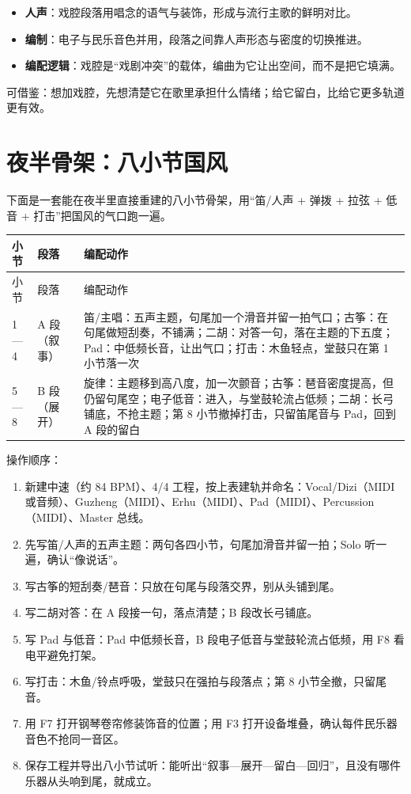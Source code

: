\begin{itemize}
\item \textbf{人声}：戏腔段落用唱念的语气与装饰，形成与流行主歌的鲜明对比。
\item \textbf{编制}：电子与民乐音色并用，段落之间靠人声形态与密度的切换推进。
\item \textbf{编配逻辑}：戏腔是“戏剧冲突”的载体，编曲为它让出空间，而不是把它填满。
\end{itemize}

可借鉴：想加戏腔，先想清楚它在歌里承担什么情绪；给它留白，比给它更多轨道更有效。

\section{夜半骨架：八小节国风}
\label{sec:guofeng-yeban}

下面是一套能在夜半里直接重建的八小节骨架，用“笛/人声 + 弹拨 + 拉弦 + 低音 + 打击”把国风的气口跑一遍。

\begin{longtable}{p{}p{}p{}}
\toprule
小节 & 段落 & 编配动作 \\
\midrule
\endfirsthead
\toprule
小节 & 段落 & 编配动作 \\
\midrule
\endhead
1—4 & A 段（叙事） & 笛/主唱：五声主题，句尾加一个滑音并留一拍气口；古筝：在句尾做短刮奏，不铺满；二胡：对答一句，落在主题的下五度；Pad：中低频长音，让出气口；打击：木鱼轻点，堂鼓只在第 1 小节落一次 \\
5—8 & B 段（展开） & 旋律：主题移到高八度，加一次颤音；古筝：琶音密度提高，但仍留句尾空；电子低音：进入，与堂鼓轮流占低频；二胡：长弓铺底，不抢主题；第 8 小节撤掉打击，只留笛尾音与 Pad，回到 A 段的留白 \\
\bottomrule
\end{longtable}

操作顺序：

\begin{sloppypar}
\begin{enumerate}
\item 新建中速（约 84 BPM）、4/4 工程，按上表建轨并命名：Vocal/Dizi（MIDI 或音频）、Guzheng（MIDI）、Erhu（MIDI）、Pad（MIDI）、Percussion（MIDI）、Master 总线。
\item 先写笛/人声的五声主题：两句各四小节，句尾加滑音并留一拍；Solo 听一遍，确认“像说话”。
\item 写古筝的短刮奏/琶音：只放在句尾与段落交界，别从头铺到尾。
\item 写二胡对答：在 A 段接一句，落点清楚；B 段改长弓铺底。
\item 写 Pad 与低音：Pad 中低频长音，B 段电子低音与堂鼓轮流占低频，用 F8 看电平避免打架。
\item 写打击：木鱼/铃点呼吸，堂鼓只在强拍与段落点；第 8 小节全撤，只留尾音。
\item 用 F7 打开钢琴卷帘修装饰音的位置；用 F3 打开设备堆叠，确认每件民乐器音色不抢同一音区。
\item 保存工程并导出八小节试听：能听出“叙事—展开—留白—回归”，且没有哪件乐器从头响到尾，就成立。
\end{enumerate}
\end{sloppypar}


